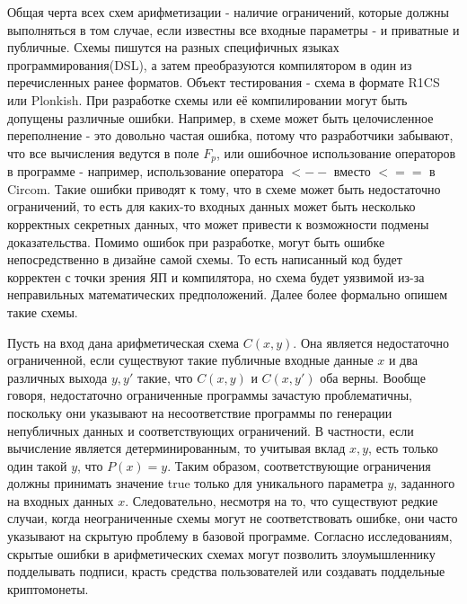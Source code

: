 \documentclass[a4paper]{article}
\begin{document}
Общая черта всех схем арифметизации - наличие ограничений, которые должны выполняться в том случае, если известны все входные параметры - и приватные и публичные. Схемы пишутся на разных специфичных языках программирования(DSL), а затем преобразуются компилятором в один из перечисленных ранее форматов. Объект тестирования - схема в формате R1CS или Plonkish. При разработке схемы или её компилировании могут быть допущены различные ошибки. Например, в схеме может быть целочисленное переполнение - это довольно частая ошибка, потому что разработчики забывают, что все вычисления ведутся в поле $F_p$, или ошибочное использование операторов в программе - например, использование оператора $<--$ вместо $<==$ в Circom. Такие ошибки приводят к тому, что в схеме может быть недостаточно ограничений, то есть для каких-то входных данных может быть несколько корректных секретных данных, что может привести к возможности подмены доказательства. Помимо ошибок при разработке, могут быть ошибке непосредственно в дизайне самой схемы. То есть написанный код будет корректен с точки зрения ЯП и компилятора, но схема будет уязвимой из-за неправильных математических предположений. Далее более формально опишем такие схемы.

Пусть на вход дана арифметическая схема $C(x,y)$. Она является недостаточно ограниченной, если существуют такие публичные входные данные $x$ и два различных выхода $y, y'$ такие, что $C(x, y)$ и $C(x, y')$ оба верны. Вообще говоря, недостаточно ограниченные программы зачастую проблематичны, поскольку они указывают на несоответствие программы по генерации непубличных данных и соответствующих ограничений. В частности, если вычисление является детерминированным, то учитывая вклад $x, y$, есть только один такой $y$, что $P(x)=y$. Таким образом, соответствующие ограничения должны принимать значение true только для уникального параметра $y$, заданного на входных данных $x$. Следовательно, несмотря на то, что существуют редкие случаи, когда неограниченные схемы могут не соответствовать ошибке, они часто указывают на скрытую проблему в базовой программе. Согласно исследованиям, скрытые ошибки в арифметических схемах могут позволить злоумышленнику подделывать подписи, красть средства пользователей или создавать поддельные криптомонеты. 
\end{document}
